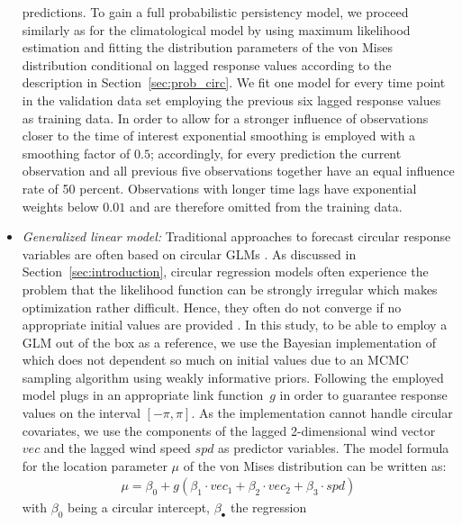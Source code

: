 \documentclass[nojss]{jss}
\numberwithin{equation}{section}
\begin{document}
\begin{itemize}
predictions.
\newline
To gain a full probabilistic persistency model, we proceed similarly as for the
climatological model by using maximum likelihood estimation and fitting the distribution
parameters of the von Mises distribution conditional on lagged response values
according to the description in Section~\ref{sec:prob_circ}. We fit one model
for every time point in the validation data set employing the previous six
lagged response values as training data. In order to allow for a stronger
influence of observations closer to the time of interest exponential
smoothing is employed with a smoothing factor of $0.5$; accordingly, for every
prediction the current observation and all previous five observations together
have an equal influence rate of 50 percent. Observations with longer time lags
have exponential weights below $0.01$ and are therefore omitted
from the training data.
\item \emph{Generalized linear model:}
Traditional approaches to forecast circular response variables are often based on
circular GLMs \citep{Fisher:1993}. As discussed in
Section~\ref{sec:introduction}, circular regression models often experience
the problem that the likelihood function can be strongly irregular which makes
optimization rather difficult. Hence, they often do not converge if no
appropriate initial values are provided \citep{Pewsey+Neuhaeuser+Ruxton:2013,
Gill+Hangartner:2010}. In this study, to be able to employ a GLM out of the box
as a reference, we use the Bayesian implementation of
\cite{Mulder+Klugkist:2017} which does not dependent so much on initial values
due to an MCMC sampling algorithm using weakly informative priors.
\newline
Following \cite{Mulder+Klugkist:2017} the employed model plugs in an
appropriate link function~$g$ in order to guarantee response values on the
interval $[-\pi,\pi]$. As the implementation cannot handle circular covariates,
we use the components of the lagged 2-dimensional wind vector $vec$ and the lagged
wind speed $spd$ as predictor variables. The model formula for the location parameter
$\mu$ of the von Mises distribution can be written as:
\begin{align}
\mu = \beta_0 + g(\beta_1 \cdot vec_{1} + \beta_2 \cdot vec_{2} + \beta_3 \cdot spd)
\end{align}
with $\beta_0$ being a circular intercept, $\beta_\bullet$ the regression

\end{itemize}
\end{document}
